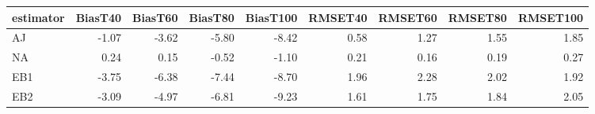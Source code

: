 \begin{table}[ht]
\centering
\begin{tabular}{lrrrrrrrr}
  \toprule
estimator & BiasT40 & BiasT60 & BiasT80 & BiasT100 & RMSET40 & RMSET60 & RMSET80 & RMSET100 \\ 
  \midrule
AJ & -1.07 & -3.62 & -5.80 & -8.42 & 0.58 & 1.27 & 1.55 & 1.85 \\ 
  NA & 0.24 & 0.15 & -0.52 & -1.10 & 0.21 & 0.16 & 0.19 & 0.27 \\ 
  EB1 & -3.75 & -6.38 & -7.44 & -8.70 & 1.96 & 2.28 & 2.02 & 1.92 \\ 
  EB2 & -3.09 & -4.97 & -6.81 & -9.23 & 1.61 & 1.75 & 1.84 & 2.05 \\ 
   \bottomrule
\end{tabular}
\end{table}
